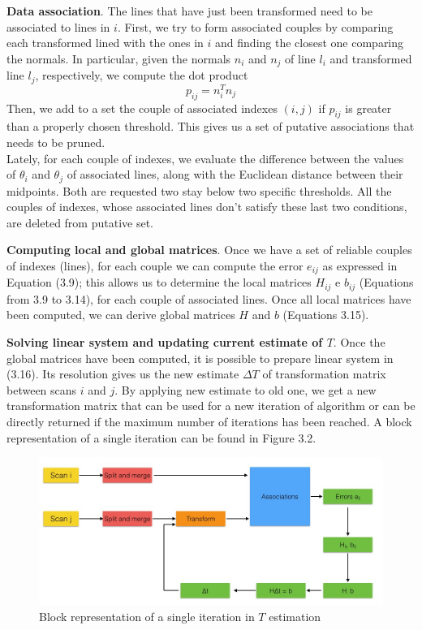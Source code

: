 \documentclass[a4paper, onecolumn]{report}
\begin{document}
\textbf{Data association}. The lines that have just been transformed need to be associated to lines in $i$. First, we try to form associated couples by comparing each transformed lined with the ones in $i$ and finding the closest one comparing the normals. In particular, given the normals $n_i$ and $n_j$ of line $l_i$ and transformed line $l_j$, respectively, we compute the dot product
\begin{equation}
	p_{ij} = n_i^Tn_j
\end{equation}
Then, we add to a set the couple of associated indexes $(i, j)$ if $p_{ij}$ is greater than a properly chosen threshold. This gives us a set of putative associations that needs to be pruned. \\
Lately, for each couple of indexes, we evaluate the difference between the values of $\theta_i$ and $\theta_j$ of associated lines, along with the Euclidean distance between their midpoints. Both are requested two stay below two specific thresholds. All the couples of indexes, whose associated lines don't satisfy these last two conditions, are deleted from putative set. 

\textbf{Computing local and global matrices}. Once we have a set of reliable couples of indexes (lines), for each couple we can compute the error $e_{ij}$ as expressed in Equation (3.9); this allows us to determine the local matrices $H_{ij}$ e $b_{ij}$ (Equations from 3.9 to 3.14), for each couple of associated lines. Once all local matrices have been computed, we can derive global matrices $H$ and $b$ (Equations 3.15).

\textbf{Solving linear system and updating current estimate of $T$}. Once the global matrices have been computed, it is possible to prepare linear system in (3.16). Its resolution gives us the new estimate $\Delta T$ of transformation matrix between scans $i$ and $j$.  By applying new estimate to old one, we get a new transformation matrix that can be used for a new iteration of algorithm or can be directly returned if the maximum number of iterations has been reached. A block representation of a single iteration can be found in Figure 3.2.

\begin{figure}[htbp]
\centering
\includegraphics[width=.90\textwidth]{images/iterative_process.jpg}
\caption{Block representation of a single iteration in $T$ estimation}
\end{figure}
\end{document}
